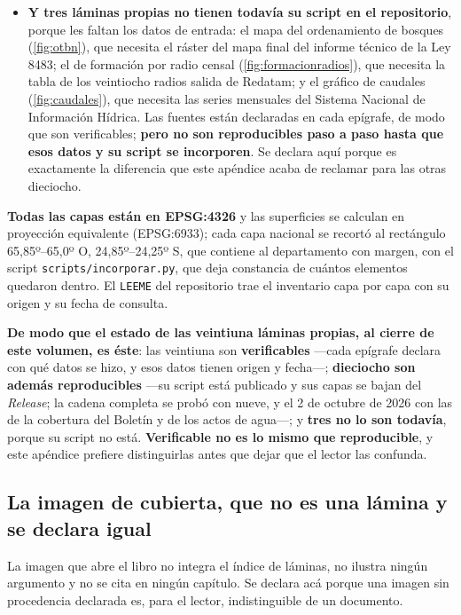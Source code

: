 \begin{itemize}[leftmargin=*,nosep]
\item \textbf{Y tres láminas propias no tienen todavía su script en el repositorio}, porque
les faltan los datos de entrada: el mapa del ordenamiento de bosques (\ref{fig:otbn}), que
necesita el ráster del mapa final del informe técnico de la Ley 8483; el de formación por radio
censal (\ref{fig:formacionradios}), que necesita la tabla de los veintiocho radios salida de
Redatam; y el gráfico de caudales (\ref{fig:caudales}), que necesita las series mensuales del
Sistema Nacional de Información Hídrica. Las fuentes están declaradas en cada epígrafe, de modo
que son verificables; \textbf{pero no son reproducibles paso a paso hasta que esos datos y su
script se incorporen}. Se declara aquí porque es exactamente la diferencia que este apéndice
acaba de reclamar para las otras dieciocho.
\end{itemize}

\textbf{Todas las capas están en EPSG:4326} y las superficies se calculan en proyección
equivalente (EPSG:6933); cada capa nacional se recortó al rectángulo 65,85º--65,0º O,
24,85º--24,25º S, que contiene al departamento con margen, con el script
\texttt{scripts/incorporar.py}, que deja constancia de cuántos elementos quedaron dentro. El
\texttt{LEEME} del repositorio trae el inventario capa por capa con su origen y su fecha de
consulta.

\textbf{De modo que el estado de las veintiuna láminas propias, al cierre de este volumen, es
éste}: las veintiuna son \textbf{verificables} ---cada epígrafe declara con qué datos se hizo, y
esos datos tienen origen y fecha---; \textbf{dieciocho son además reproducibles} ---su script
está publicado y sus capas se bajan del \textit{Release}; la cadena completa se probó con nueve, y el 2 de octubre de 2026 con las de la cobertura del Boletín y de los actos de agua---; y
\textbf{tres no lo son todavía}, porque su script no está. \textbf{Verificable no es lo
mismo que reproducible}, y este apéndice prefiere distinguirlas antes que dejar que el lector
las confunda.

\subsection*{La imagen de cubierta, que no es una lámina y se declara igual}

La imagen que abre el libro no integra el índice de láminas, no ilustra ningún argumento y no
se cita en ningún capítulo. Se declara acá porque una imagen sin procedencia declarada es, para
el lector, indistinguible de un documento.

